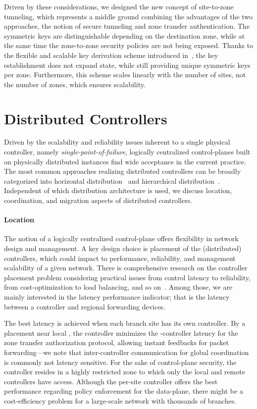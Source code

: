Driven by these considerations, we designed the new concept of site-to-zone tunneling,
which represents a middle ground combining the advantages of the two approaches, the
notion of secure tunneling and zone transfer authentication. The symmetric keys
are distinguishable depending on the destination zone, while at the same time the
zone-to-zone security policies are not being exposed. Thanks to the flexible and scalable
key derivation scheme introduced in~\cite{rot2020piskes}, the key establishment does not expand
state, while still providing unique symmetric keys per zone. Furthermore, this scheme scales
linearly with the number of sites, not the number of zones, which ensures scalability.

\section{Distributed Controllers}
\label{sec:distributedcontroller}
Driven by the scalability and reliability issues inherent to a single physical controller,
namely \textit{single-point-of-failure}, logically centralized control-planes built on
physically distributed instances find wide acceptance in the current practice. The most
common approaches realizing distributed controllers can be broadly categorized into
horizontal distribution~\cite{berde2014onos,medved2014opendaylight} and hierarchical
distribution~\cite{hassas2012kandoo,yap2017taking}. Independent of which distribution
architecture is used, we discuss location, coordination, and migration aspects of distributed
controllers.

\paragraph{Location}
The notion of a logically centralized control-plane offers flexibility in network design
and management. A key design choice is placement of the (distributed) controllers, which
could impact to performance, reliability, and management scalability of a given network.
There is comprehensive research on the controller placement problem considering practical
issues from control latency to reliability, from cost-optimization to load balancing, and so
on~\cite{das2019survey,zhang2017role,he2019toward}. Among those, we are mainly interested in the
latency performance indicator; that is the latency between a controller and regional forwarding
devices.

The best latency is achieved when each branch site has its own controller. By a placement
near local \tps, the controller minimizes the \tp-controller latency for the zone
transfer authorization protocol, allowing instant feedbacks for packet forwarding---we note
that inter-controller communication for global coordination is commonly not latency sensitive.
For the sake of control-plane security, the controller resides in a highly restricted zone to
which only the local \tps and remote controllers have access. Although the per-site controller
offers the best performance regarding policy enforcement for the data-plane, there might be a
cost-efficiency problem for a large-scale network with thousands of branches.

